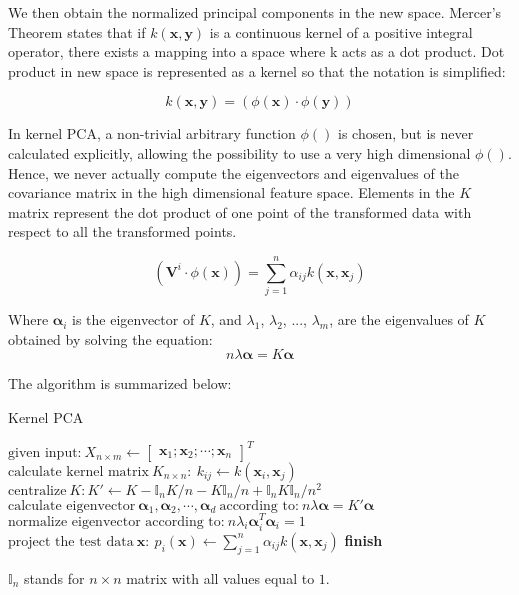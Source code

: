 We then obtain the normalized principal components in the new space. Mercer’s Theorem states that if $k(\pmb{x}, \pmb{y})$ is a continuous kernel of a positive integral operator, there exists a mapping into a space where k acts as a dot product. Dot product in new space is represented as a kernel so that the notation is simplified: 

\begin{equation}
k(\pmb{x}, \pmb{y}) = (\phi(\pmb{x}) \cdot \phi(\pmb{y}))
\end{equation}

In kernel PCA, a non-trivial arbitrary function $\phi()$ is chosen, but is never calculated explicitly, allowing the possibility to use a very high dimensional $\phi()$. Hence, we never actually compute the eigenvectors and eigenvalues of the covariance matrix in the high dimensional feature space. Elements in the $K$ matrix represent the dot product of one point of the transformed data with respect to all the transformed points.

\begin{equation}
(\pmb{V}^i \cdot \phi(\pmb{x})) = \sum_{j=1}^n \alpha_{ij} k(\mathbf{x}, \mathbf{x}_j)
\end{equation}

Where $\pmb{\alpha}_i$ is the eigenvector of $K$, and $\lambda_1$, $\lambda_2$, ...,  $\lambda_m$, are the eigenvalues of $K$ obtained by solving the equation:
\begin{equation}
n \lambda \pmb{\alpha} = K \pmb{\alpha}
\end{equation}

The algorithm is summarized below:

\begin{algorithm}[H]
\caption{Kernel PCA}
\label{PCA}
\begin{algorithmic}[1]
	\State $\text{given input:} \  X_{n \times m} \leftarrow \begin{bmatrix} \mathbf{x}_1; \mathbf{x}_2; \cdots; \mathbf{x}_n \end{bmatrix}^T$
	\State $\text{calculate kernel matrix} \  K_{n \times n}: \  k_{ij} \leftarrow k(\mathbf{x}_i, \mathbf{x}_j)$
	\State $\text{centralize} \  K:  K' \leftarrow K - \mathbb{I}_nK/n - K\mathbb{I}_n/n + \mathbb{I}_nK\mathbb{I}_n/n^2$
	\State $\text{calculate eigenvector} \ \pmb{\alpha}_1, \pmb{\alpha}_2, \cdots, \pmb{\alpha}_d \   \text{according to:} \  n \lambda \pmb{\alpha} = K' \pmb{\alpha}$
	\State $\text{normalize eigenvector according to:} \  n \lambda_i \pmb{\alpha}_i^T \pmb{\alpha}_i = 1$
	\State $\text{project the test data} \  \mathbf{x}:  \  p_i(\mathbf{x}) \leftarrow \sum_{j=1}^n \alpha_{ij} k(\mathbf{x}, \mathbf{x}_j) $
\BState \bf finish
\EndProcedure
\end{algorithmic}
\end{algorithm}
 $\mathbb{I}_n$ stands for $n \times n$ matrix with all values equal to $1$.

